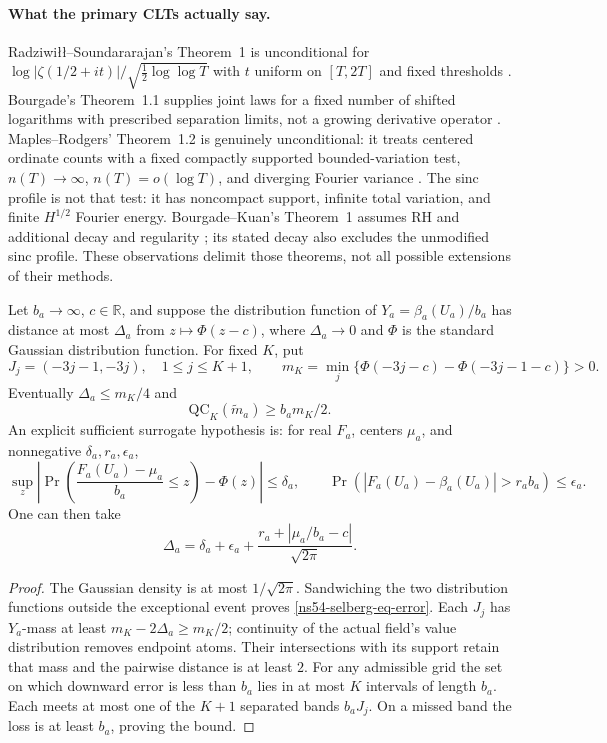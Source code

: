 \paragraph{What the primary CLTs actually say.}
Radziwi\l\l--Soundararajan's Theorem~1 is unconditional for
$\log|\zeta(1/2+it)|/\sqrt{\tfrac12\log\log T}$ with
$t$ uniform on $[T,2T]$ and fixed thresholds
\cite{ns54-RadziwillSoundararajan}.
Bourgade's Theorem~1.1 supplies joint laws for a fixed number of
shifted logarithms with prescribed separation limits, not a
growing derivative operator \cite{ns54-Bourgade}.
Maples--Rodgers' Theorem~1.2 is genuinely unconditional: it treats
centered ordinate counts with a fixed compactly supported
bounded-variation test, $n(T)\to\infty$, $n(T)=o(\log T)$, and
diverging Fourier variance \cite{ns54-MaplesRodgers}.
The sinc profile is not that test: it has noncompact support,
infinite total variation, and finite $H^{1/2}$ Fourier energy.
Bourgade--Kuan's Theorem~1 assumes RH and additional decay and
regularity \cite{ns54-BourgadeKuan}; its stated decay also excludes
the unmodified sinc profile. These observations delimit those
theorems, not all possible extensions of their methods.

\begin{proposition}
\label{ns54-selberg-prop-transfer}
Let $b_a\to\infty$, $c\in\mathbb R$, and suppose the distribution
function of $Y_a=\beta_a(U_a)/b_a$ has distance at most $\Delta_a$
from $z\mapsto\Phi(z-c)$, where $\Delta_a\to0$ and $\Phi$ is
the standard Gaussian distribution function. For fixed $K$, put
\[
 J_j=(-3j-1,-3j),\quad 1\le j\le K+1,\qquad
 m_K=\min_j\{\Phi(-3j-c)-\Phi(-3j-1-c)\}>0.
\]
Eventually $\Delta_a\le m_K/4$ and
\begin{equation}\label{ns54-selberg-eq-transfer}
                  \mathrm{QC}_K(\widetilde m_a)\ge b_am_K/2.
\end{equation}
An explicit sufficient surrogate hypothesis is: for real $F_a$,
centers $\mu_a$, and nonnegative $\delta_a,r_a,\epsilon_a$,
\[
 \sup_z\left|\Pr\left(\frac{F_a(U_a)-\mu_a}{b_a}\le z\right)
                    -\Phi(z)\right|\le\delta_a,\qquad
 \Pr(|F_a(U_a)-\beta_a(U_a)|>r_ab_a)\le\epsilon_a.
\]
One can then take
\begin{equation}\label{ns54-selberg-eq-error}
 \Delta_a=\delta_a+\epsilon_a+
             \frac{r_a+|\mu_a/b_a-c|}{\sqrt{2\pi}}.
\end{equation}
\end{proposition}
\begin{proof}
The Gaussian density is at most $1/\sqrt{2\pi}$. Sandwiching the
two distribution functions outside the exceptional event proves
\eqref{ns54-selberg-eq-error}. Each $J_j$ has $Y_a$-mass at least
$m_K-2\Delta_a\ge m_K/2$; continuity of the actual field's value
distribution removes endpoint atoms. Their intersections with its
support retain that mass and the pairwise distance is at least $2$.
For any admissible grid the set on which downward error is less
than $b_a$ lies in at most $K$ intervals of length $b_a$.
Each meets at most one of the $K+1$ separated bands $b_aJ_j$.
On a missed band the loss is at least $b_a$, proving the bound.
\end{proof}

